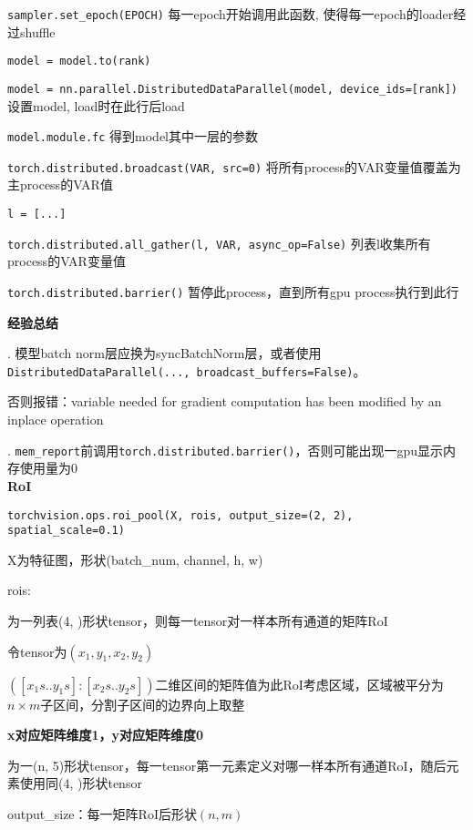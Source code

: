 \documentclass[UTF8]{ctexart}
\begin{document}
  \quad \quad \texttt{sampler.set\_epoch(EPOCH)} 每一epoch开始调用此函数, 使得每一epoch的loader经过shuffle
  
  \quad \quad \texttt{model = model.to(rank)}

  \quad \quad \texttt{model = nn.parallel.DistributedDataParallel(model, device\_ids=[rank])} 设置model, load时在此行后load

  \quad \quad \texttt{model.module.fc} 得到model其中一层的参数

  \quad \quad \texttt{torch.distributed.broadcast(VAR, src=0)} 将所有process的VAR变量值覆盖为主process的VAR值

  \quad \quad \texttt{l = [...]}

  \quad \quad \texttt{torch.distributed.all\_gather(l, VAR, async\_op=False)} 列表l收集所有process的VAR变量值
  
  \quad \quad \texttt{torch.distributed.barrier()} 暂停此process，直到所有gpu process执行到此行

  \quad \quad \textbf{经验总结}
  
  \quad \quad {}. 模型batch norm层应换为syncBatchNorm层，或者使用\texttt{DistributedDataParallel(..., broadcast\_buffers=False)}。
  
  \quad \quad \quad \quad 否则报错：variable needed for gradient computation has been modified by an inplace operation 
  
  \quad \quad {}. \texttt{mem\_report}前调用\texttt{torch.distributed.barrier()}，否则可能出现一gpu显示内存使用量为0\\
\textbf{RoI}

  \texttt{torchvision.ops.roi\_pool(X, rois, output\_size=(2, 2), spatial\_scale=0.1)}

  \quad X为特征图，形状(batch\_num, channel, h, w)

  \quad rois:

  \quad \quad 为一列表(4, )形状tensor，则每一tensor对一样本所有通道的矩阵RoI

  \quad \quad \quad 令tensor为$(x_1, y_1, x_2, y_2)$

  \quad \quad \quad $([x_1 s .. y_1 s]: [x_2 s .. y_2 s])$二维区间的矩阵值为此RoI考虑区域，区域被平分为$n \times m$子区间，分割子区间的边界向上取整

  \quad \quad \quad \textbf{x对应矩阵维度1，y对应矩阵维度0}

  \quad \quad 为一(n, 5)形状tensor，每一tensor第一元素定义对哪一样本所有通道RoI，随后元素使用同(4, )形状tensor

  \quad output\_size：每一矩阵RoI后形状$(n, m)$
\end{document}
